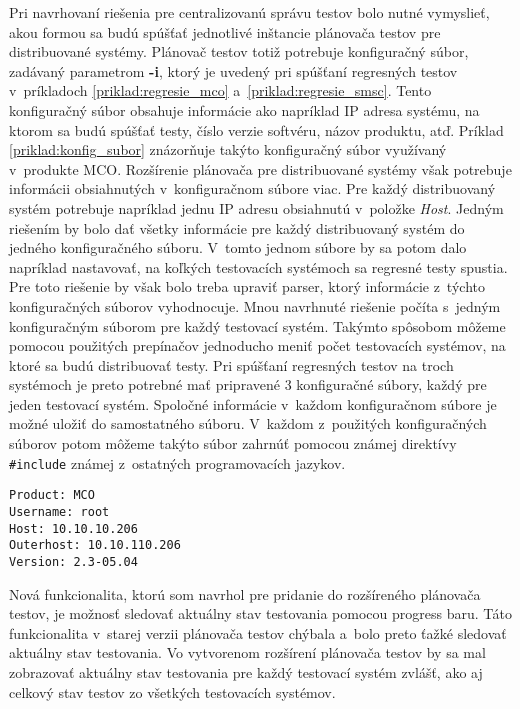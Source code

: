 Pri navrhovaní riešenia pre centralizovanú správu testov bolo nutné 
vymyslieť, akou formou sa budú spúšťať jednotlivé inštancie plánovača testov pre 
distribuované systémy. Plánovač testov totiž potrebuje konfiguračný súbor,
zadávaný parametrom \textbf{-i}, ktorý je uvedený pri spúšťaní regresných testov
v~príkladoch \ref{priklad:regresie_mco} a~\ref{priklad:regresie_smsc}.
Tento konfiguračný súbor obsahuje informácie ako napríklad IP adresa systému, na ktorom sa 
budú spúšťať testy, číslo verzie softvéru, názov 
produktu, atď. Príklad \ref{priklad:konfig_subor} znázorňuje takýto 
konfiguračný súbor využívaný v~produkte MCO. 
Rozšírenie plánovača pre distribuované systémy však potrebuje informácii 
obsiahnutých v~konfiguračnom súbore viac.
Pre každý distribuovaný systém potrebuje napríklad jednu IP adresu 
obsiahnutú v~položke \textit{Host}.
Jedným riešením by bolo dať všetky informácie pre každý distribuovaný 
systém do jedného konfiguračného súboru.
V~tomto jednom súbore by sa potom dalo napríklad nastavovať, na koľkých 
testovacích systémoch sa regresné testy spustia.
Pre toto riešenie by však bolo treba upraviť parser, ktorý informácie 
z~týchto konfiguračných súborov vyhodnocuje.
Mnou navrhnuté riešenie počíta s~jedným konfiguračným súborom pre 
každý testovací systém. Takýmto spôsobom môžeme pomocou použitých prepínačov
jednoducho meniť počet testovacích systémov, na ktoré sa budú distribuovať testy.
Pri spúšťaní regresných testov na troch systémoch je preto potrebné 
mať pripravené 3 konfiguračné súbory, každý pre jeden testovací systém. 
Spoločné informácie v~každom konfiguračnom súbore je možné uložiť do 
samostatného súboru. V~každom z~použitých konfiguračných súborov potom môžeme 
takýto súbor zahrnúť pomocou známej direktívy \texttt{\#include} 
známej z~ostatných programovacích jazykov.

\begin{lstlisting}[caption=Konfiguračný súbor pre produkt MCO,label=priklad:konfig_subor]
Product: MCO
Username: root
Host: 10.10.10.206
Outerhost: 10.10.110.206
Version: 2.3-05.04
\end{lstlisting}

Nová funkcionalita, ktorú som navrhol pre pridanie do rozšíreného 
plánovača testov, je možnosť sledovať aktuálny stav testovania pomocou 
progress baru. 
Táto funkcionalita v~starej verzii plánovača testov chýbala a~bolo 
preto ťažké sledovať aktuálny stav testovania. 
Vo vytvorenom rozšírení plánovača testov by sa mal zobrazovať aktuálny stav 
testovania pre každý testovací systém zvlášť, ako aj celkový stav testov
zo všetkých testovacích systémov.

